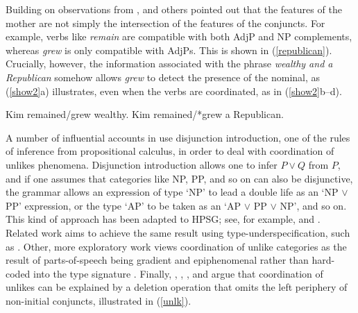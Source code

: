 {\noindent
Building on observations from \citet[417]{jacobson}, \citet{Sag:03} and others pointed out
that the features of the mother are not simply the intersection of the features of the conjuncts. 
For example, verbs like \emph{remain} are compatible with both
AdjP and NP complements, whereas \emph{grew}
is only compatible with AdjPs.
This is shown in  (\ref{republican}).
Crucially, however, the information associated with
the phrase \emph{wealthy and a Republican}
somehow allows \emph{grew} to detect the presence of
the nominal, as (\ref{show2}a) illustrates, even
when the verbs
are coordinated, as in (\ref{show2}b--d).


\begin{exe}
\ex
\begin{xlista}
\ex  Kim remained/grew wealthy.
\ex  Kim remained/*grew a Republican.
\end{xlista}\label{republican}
\end{exe}



\begin{exe}
\ex
\begin{xlista}
\end{xlista}\label{show2}
\end{exe}


A number of influential accounts in 
\citep{morrill90,morrill94,bayer}\addpages  use  disjunction introduction, 
one of the rules of
inference from propositional calculus,  in order to deal with
coordination of unlikes phenomena. Disjunction introduction 
 allows  one to infer $P \vee Q$ from  $P$, and if one assumes
 that categories like NP, PP, and so on can also be disjunctive, the grammar allows an expression of type `NP' to lead a double life as an `NP $\vee$ PP' expression,
or the type `AP' to be taken as an `AP $\vee$ PP $\vee$ NP', and so
on. This kind of approach has been adapted to HPSG; see, for example, \citet{Daniels02} and  \citet{Yatabe:04}.
Related work aims to achieve the same result using type-underspecification, such as 
 \citet{Sag:03}. Other, more exploratory work views coordination of unlike categories as the result of   parts-of-speech being gradient and  epiphenomenal rather than hard-coded into the type signature \citep{Chaves2013b-u}. Finally, \citet{berthold0}, \citet{yatabe},  \citet{Beavers}, and \citet{chaves06}  argue that
coordination of unlikes can be explained by
a deletion operation that omits the left periphery of
non-initial conjuncts, illustrated in   (\ref{unlk}).

}

